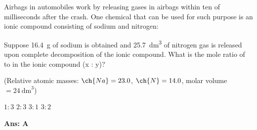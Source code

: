 \documentclass[border=3pt,varwidth=75mm]{standalone}
\begin{document}
 
Airbags in automobiles work by releasing gases in airbags within ten of milliseconds after the crash. One chemical that can be used for such purpose is an ionic compound consisting of sodium and nitrogen:
\begin{center}
\end{center}
Suppose \SI{16.4}{\gram} of sodium is obtained and \SI{25.7}{\cubic\dm} of nitrogen gas is released upon complete decomposition of the ionic compound. What is the mole ratio of  to  in the ionic compound (x : y)?

(Relative atomic masses: $\ch{Na}=23.0$, $\ch{N}=14.0$, molar volume $=\SI{24}{\cubic\dm}$)

\begin{choices}
\choice $1:3$
\choice $2:3$
\choice $3:1$
\choice $3:2$
\end{choices}

\begin{answer}
\hrulefill\par
\textbf{Ans: A}

\end{answer}
\end{document}
